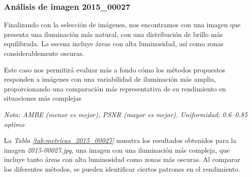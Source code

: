\documentclass[sigchi]{acmart}
\begin{document}
\subsubsection{\textbf{Análisis de imagen 2015\_00027}}

Finalizando con la selección de imágenes, nos encontramos con una imagen que presenta una
iluminación más natural, con una distribución de brillo más equilibrada. La escena incluye
áreas con alta luminosidad, así como zonas considerablemente oscuras.

Este caso nos permitirá evaluar más a fondo cómo los métodos propuestos responden a imágenes
con una variabilidad de iluminación más amplia, proporcionando una comparación más
representativa de su rendimiento en situaciones más complejas

\begin{table}[H]
	\centering
	\caption{Métricas de calidad para la imagen 2015\_00027.jpg}
	\label{tab:metricas_2015_00027}
	\vspace{0.5em}


	\vspace{0.5em}
	\footnotesize%
	\textit{Nota: AMBE (menor es mejor), PSNR (mayor es mejor). Uniformidad: 0.6–0.85 optimo}
\end{table}

La \emph{Tabla \ref{tab:metricas_2015_00027}} muestra los resultados obtenidos para la imagen
\emph{2015-00027.jpg}, una imagen con una iluminación más compleja, que incluye tanto áreas con alta
luminosidad como zonas más oscuras. Al comparar los diferentes métodos, se pueden identificar
ciertos patrones en el rendimiento.
\end{document}
